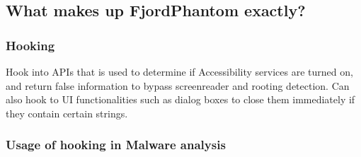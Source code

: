 \label{task:20240517_android}

\subsection{What makes up FjordPhantom exactly?}

\subsubsection{Hooking}

Hook into APIs that is used to determine if Accessibility services are turned on, and return false information to bypass screenreader and rooting detection. Can also hook to UI functionalities such as dialog boxes to close them immediately if they contain certain strings.

\subsubsection{Usage of hooking in Malware analysis}
